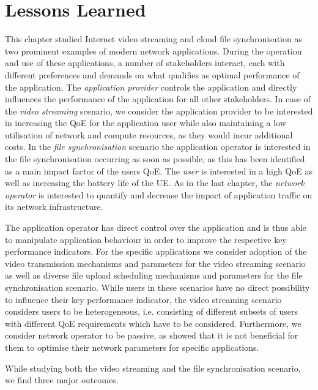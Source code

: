 \section{Lessons Learned}\label{sec:application:lessons_learned}
This chapter studied Internet video streaming and cloud file synchronisation as two prominent examples of modern network applications.
During the operation and use of these applications, a number of stakeholders interact, each with different preferences and demands on what qualifies as optimal performance of the application.
The \emph{application provider} controls the application and directly influences the performance of the application for all other stakeholders.
In case of the \emph{video streaming} scenario, we consider the application provider to be interested in increasing the \gls{QoE} for the application user while also maintaining a low utilisation of network and compute resources, as they would incur additional costs.
In the \emph{file synchronisation} scenario the application operator is interested in the file synchronisation occurring as soon as possible, as this has been identified as a main impact factor of the users \gls{QoE}.
The \emph{user} is interested in a high \gls{QoE} as well as increasing the battery life of the \gls{UE}.
As in the last chapter, the \emph{network operator} is interested to quantify and decrease the impact of application traffic on its network infrastructure.

The application operator has direct control over the application and is thus able to manipulate application behaviour in order to improve the respective key performance indicators.
For the specific applications we consider adoption of the video transmission mechanisms and parameters for the video streaming scenario as well as diverse file upload scheduling mechanisms and parameters for the file synchronisation scenario.
While users in these scenarios have no direct possibility to influence their key performance indicator, the video streaming scenario considers users to be heterogeneous, i.e. consisting of different subsets of users with different \gls{QoE} requirements which have to be considered.
Furthermore, we consider network operator to be passive, as  showed that it is not beneficial for them to optimise their network parameters for specific applications.

While studying both the video streaming and the file synchronisation scenario, we find three major outcomes.

